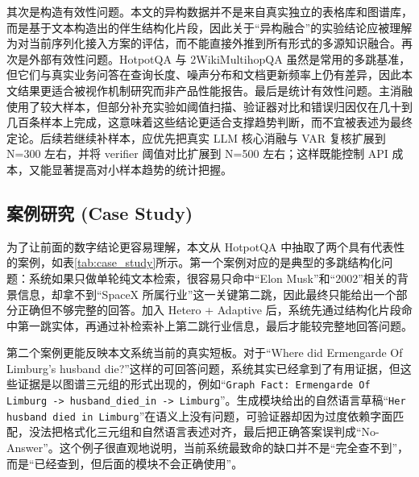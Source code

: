 其次是构造有效性问题。本文的异构数据并不是来自真实独立的表格库和图谱库，而是基于文本构造出的伴生结构化片段，因此关于“异构融合”的实验结论应被理解为对当前序列化接入方案的评估，而不能直接外推到所有形式的多源知识融合。再次是外部有效性问题。HotpotQA 与 2WikiMultihopQA 虽然是常用的多跳基准，但它们与真实业务问答在查询长度、噪声分布和文档更新频率上仍有差异，因此本文结果更适合被视作机制研究而非产品性能报告。最后是统计有效性问题。主消融使用了较大样本，但部分补充实验如阈值扫描、验证器对比和错误归因仅在几十到几百条样本上完成，这意味着这些结论更适合支撑趋势判断，而不宜被表述为最终定论。后续若继续补样本，应优先把真实 LLM 核心消融与 VAR 复核扩展到 N=300 左右，并将 verifier 阈值对比扩展到 N=500 左右；这样既能控制 API 成本，又能显著提高对小样本趋势的统计把握。

\subsection{案例研究 (Case Study)}

为了让前面的数字结论更容易理解，本文从 HotpotQA 中抽取了两个具有代表性的案例，如表\ref{tab:case_study}所示。第一个案例对应的是典型的多跳结构化问题：系统如果只做单轮纯文本检索，很容易只命中“Elon Musk”和“2002”相关的背景信息，却拿不到“SpaceX 所属行业”这一关键第二跳，因此最终只能给出一个部分正确但不够完整的回答。加入 Hetero + Adaptive 后，系统先通过结构化片段命中第一跳实体，再通过补检索补上第二跳行业信息，最后才能较完整地回答问题。

第二个案例更能反映本文系统当前的真实短板。对于“Where did Ermengarde Of Limburg's husband die?”这样的可回答问题，系统其实已经拿到了有用证据，但这些证据是以图谱三元组的形式出现的，例如“\texttt{Graph Fact: Ermengarde Of Limburg -> husband\_died\_in -> Limburg}”。生成模块给出的自然语言草稿“\texttt{Her husband died in Limburg}”在语义上没有问题，可验证器却因为过度依赖字面匹配，没法把格式化三元组和自然语言表述对齐，最后把正确答案误判成“No-Answer”。这个例子很直观地说明，当前系统最致命的缺口并不是“完全查不到”，而是“已经查到，但后面的模块不会正确使用”。

